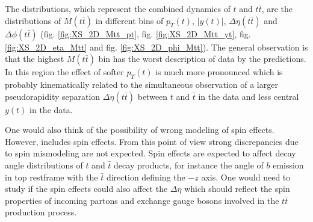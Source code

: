The distributions, which represent the combined dynamics of $t$ and $t\bar{t}$, are the distributions of $M(t\bar{t})$ in different bins of $p_{T}(t)$, $|y(t)|$,
$\Delta\eta(t\bar{t})$ and $\Delta\phi(t\bar{t})$ (fig. \ref{fig:XS_2D_Mtt_pt}, fig. \ref{fig:XS_2D_Mtt_yt}, fig. \ref{fig:XS_2D_eta_Mtt}
and fig. \ref{fig:XS_2D_phi_Mtt}). The general observation is that the highest $M(t\bar{t})$ bin has the worst description of data by the predictions. In this region 
the effect of softer $p_{T}(t)$ is much more pronounced which is probably kinematically related to the simultaneous observation of a larger pseudorapidity
separation $\Delta\eta(t\bar{t})$ between $t$ and $\bar{t}$ in the data and less central $y(t)$ in the data.

One would also think of the possibility of wrong modeling of spin effects. However, \MG includes spin effects. From this point of view strong discrepancies
due to spin mismodeling are not expected. Spin effects are expected to affect decay angle distributions of $t$ and $\bar{t}$ decay products,
for instance the angle of $b$ emission in top restframe with the $\bar{t}$ direction defining the $-z$ axis. One would need to study if the spin effects could also 
affect the $\Delta\eta$ which should reflect the spin properties of incoming partons and exchange gauge bosons involved in the $t\bar{t}$ production process.